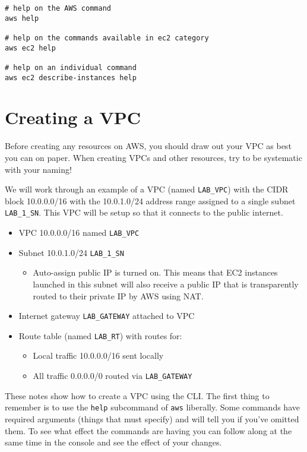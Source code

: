 \documentclass{pgnotes}
\begin{document}
\begin{verbatim}
# help on the AWS command
aws help

# help on the commands available in ec2 category
aws ec2 help

# help on an individual command 
aws ec2 describe-instances help
\end{verbatim}

\section{Creating a VPC}\label{creating-a-vpc}

Before creating any resources on AWS, you should draw out your VPC as
best you can on paper. When creating VPCs and other resources, try to be
systematic with your naming!

We will work through an example of a VPC (named \texttt{LAB\_VPC}) with
the CIDR block 10.0.0.0/16 with the 10.0.1.0/24 address range assigned
to a single subnet \texttt{LAB\_1\_SN}. This VPC will be setup so that
it connects to the public internet.

\begin{itemize}
\item
  VPC 10.0.0.0/16 named \texttt{LAB\_VPC}
\item
  Subnet 10.0.1.0/24 \texttt{LAB\_1\_SN}

  \begin{itemize}
  
  \item
    Auto-assign public IP is turned on. This means that EC2 instances
    launched in this subnet will also receive a public IP that is
    transparently routed to their private IP by AWS using NAT.
  \end{itemize}
\item
  Internet gateway \texttt{LAB\_GATEWAY} attached to VPC
\item
  Route table (named \texttt{LAB\_RT}) with routes for:

  \begin{itemize}
  \item
    Local traffic 10.0.0.0/16 sent locally
  \item
    All traffic 0.0.0.0/0 routed via \texttt{LAB\_GATEWAY}
  \end{itemize}
\end{itemize}

These notes show how to create a VPC using the CLI. The first thing to
remember is to use the \texttt{help} subcommand of \texttt{aws}
liberally. Some commands have required arguments (things that must
specify) and will tell you if you've omitted them. To see what effect
the commands are having you can follow along at the same time in the
console and see the effect of your changes.
\end{document}

